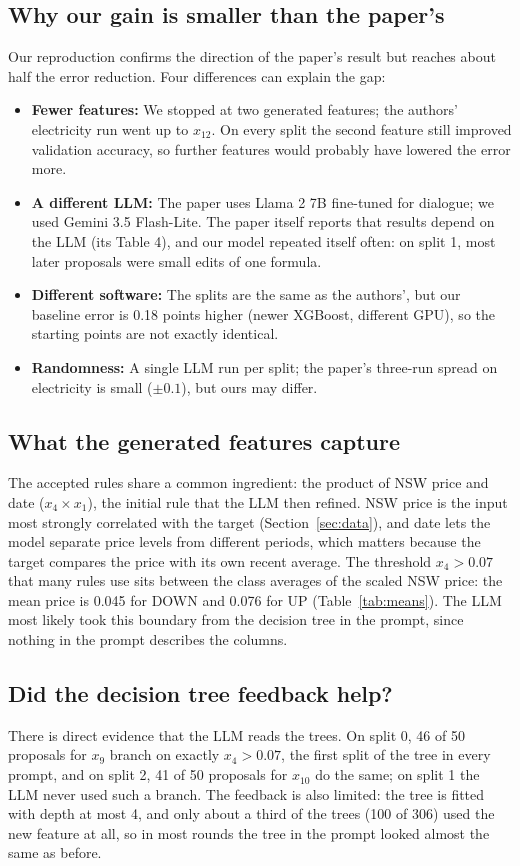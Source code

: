 \documentclass[11pt]{article}
\begin{document}
\subsection{Why our gain is smaller than the paper's}
Our reproduction confirms the direction of the paper's result but reaches about half the error
reduction. Four differences can explain the gap:
\begin{itemize}
  \item \textbf{Fewer features:} We stopped at two generated features; the authors' electricity run
        went up to $x_{12}$. On every split the second feature still improved validation accuracy,
        so further features would probably have lowered the error more.
  \item \textbf{A different LLM:} The paper uses Llama 2 7B fine-tuned for dialogue; we used Gemini 3.5
        Flash-Lite. The paper itself reports that results depend on the LLM (its Table 4), and our
        model repeated itself often: on split 1, most later proposals were small edits of one
        formula.
  \item \textbf{Different software:} The splits are the same as the authors', but our baseline error
        is 0.18 points higher (newer XGBoost, different GPU), so the starting points are not exactly
        identical.
  \item \textbf{Randomness:} A single LLM run per split; the paper's three-run spread on electricity
        is small ($\pm0.1$), but ours may differ.
\end{itemize}

\subsection{What the generated features capture}
The accepted rules share a common ingredient: the product of NSW price and date ($x_4\times x_1$),
the initial rule that the LLM then refined. NSW price is the input most strongly correlated with
the target (Section~\ref{sec:data}), and date lets the model separate price levels from different
periods, which matters because the target compares the price with its own recent average. The
threshold $x_4>0.07$ that many rules use sits between the class averages of the scaled NSW price: the
mean price is 0.045 for DOWN and 0.076 for UP (Table~\ref{tab:means}). The LLM most likely took this
boundary from the decision tree in the prompt, since nothing in the prompt describes the columns.

\subsection{Did the decision tree feedback help?}
There is direct evidence that the LLM reads the trees. On split 0, 46 of 50 proposals for $x_9$
branch on exactly $x_4>0.07$, the first split of the tree in every prompt, and on split 2, 41 of 50
proposals for $x_{10}$ do the same; on split 1 the LLM never used such a branch. The feedback is also
limited: the tree is fitted with depth at most 4, and only about a third of the trees (100 of 306)
used the new feature at all, so in most rounds the tree in the prompt looked almost the same as
before.
\end{document}
